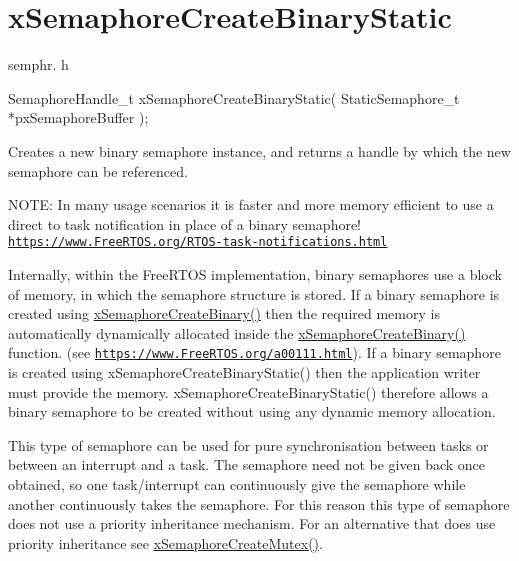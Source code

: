 \hypertarget{group__x_semaphore_create_binary_static}{}\section{x\+Semaphore\+Create\+Binary\+Static}
\label{group__x_semaphore_create_binary_static}
semphr. h 
\begin{DoxyPre}
SemaphoreHandle\_t xSemaphoreCreateBinaryStatic( StaticSemaphore\_t *pxSemaphoreBuffer );
\end{DoxyPre}


Creates a new binary semaphore instance, and returns a handle by which the new semaphore can be referenced.

N\+O\+TE\+: In many usage scenarios it is faster and more memory efficient to use a direct to task notification in place of a binary semaphore! \href{https://www.FreeRTOS.org/RTOS-task-notifications.html}{\tt https\+://www.\+Free\+R\+T\+O\+S.\+org/\+R\+T\+O\+S-\/task-\/notifications.\+html}

Internally, within the Free\+R\+T\+OS implementation, binary semaphores use a block of memory, in which the semaphore structure is stored. If a binary semaphore is created using \hyperlink{vendor_2ceedling_2plugins_2freertos_2src_2freertos_2include_2semphr_8h_acba963695e4f159d9bfa2394cae5badc}{x\+Semaphore\+Create\+Binary()} then the required memory is automatically dynamically allocated inside the \hyperlink{vendor_2ceedling_2plugins_2freertos_2src_2freertos_2include_2semphr_8h_acba963695e4f159d9bfa2394cae5badc}{x\+Semaphore\+Create\+Binary()} function. (see \href{https://www.FreeRTOS.org/a00111.html}{\tt https\+://www.\+Free\+R\+T\+O\+S.\+org/a00111.\+html}). If a binary semaphore is created using x\+Semaphore\+Create\+Binary\+Static() then the application writer must provide the memory. x\+Semaphore\+Create\+Binary\+Static() therefore allows a binary semaphore to be created without using any dynamic memory allocation.

This type of semaphore can be used for pure synchronisation between tasks or between an interrupt and a task. The semaphore need not be given back once obtained, so one task/interrupt can continuously \textquotesingle{}give\textquotesingle{} the semaphore while another continuously \textquotesingle{}takes\textquotesingle{} the semaphore. For this reason this type of semaphore does not use a priority inheritance mechanism. For an alternative that does use priority inheritance see \hyperlink{vendor_2ceedling_2plugins_2freertos_2src_2freertos_2include_2semphr_8h_aa6a00aa9b91a9e5b3ebe4ae1c3f115c6}{x\+Semaphore\+Create\+Mutex()}.



